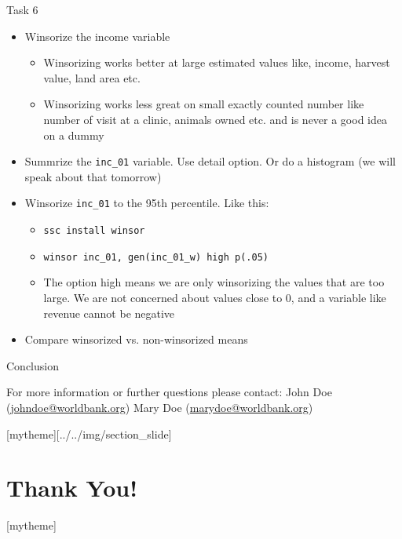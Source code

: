 \documentclass[aspectratio=169]{beamer}
\newcommand{\sectionpic}[2]{
	\setbeamertemplate{section page}[mytheme][#2]
	\section{#1}
	\setbeamertemplate{section page}[mytheme]
}
\begin{document}
\begin{frame}{Task 6}
	\begin{itemize}
		\item Winsorize the income variable
		\begin{itemize}
			\item Winsorizing works better at large estimated values like, income, harvest value, land area etc.
			\item Winsorizing works less great on small exactly counted number like number of visit at a clinic, animals owned etc. and is never a good idea on a dummy
		\end{itemize}
		\item Summrize the \texttt{inc\_01} variable. Use detail option. Or do a histogram (we will speak about that tomorrow)
		\item Winsorize \texttt{inc\_01} to the 95th percentile. Like this:
			\begin{itemize}
				\item \texttt{ssc install winsor}
				\item \texttt{winsor inc\_01, gen(inc\_01\_w) high p(.05)}
				\item The option high means we are only winsorizing the values that are too large. We are not concerned about values close to 0, and a variable like revenue cannot be negative
			\end{itemize}
		\item Compare winsorized vs. non-winsorized means
	\end{itemize}
\end{frame}

\begin{frame}{Conclusion}


\vspace{20mm}
For more information or further questions please contact:
\newline John Doe (\url{johndoe@worldbank.org}) \newline Mary Doe (\url{marydoe@worldbank.org})

\end{frame}

\sectionpic{Thank You!}{../../img/section_slide}
\end{document}
